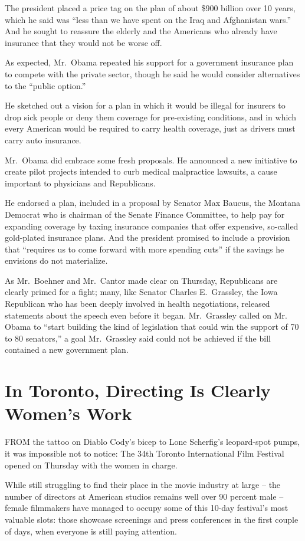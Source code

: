 ﻿\documentclass[12pt]{article}
\begin{document}
The president placed a price tag on the plan of about \$900 billion over 10 years, which he said was
``less than we have spent on the Iraq and Afghanistan wars.'' And he sought to reassure the elderly
and the Americans who already have insurance that they would not be worse off.

As expected, Mr.~Obama repeated his support for a government insurance plan to compete with the
private sector, though he said he would consider alternatives to the ``public option.''

He sketched out a vision for a plan in which it would be illegal for insurers to drop sick people or
deny them coverage for pre-existing conditions, and in which every American would be required to
carry health coverage, just as drivers must carry auto insurance.

Mr.~Obama did embrace some fresh proposals. He announced a new initiative to create pilot projects
intended to curb medical malpractice lawsuits, a cause important to physicians and Republicans.

He endorsed a plan, included in a proposal by Senator Max Baucus, the Montana Democrat who is
chairman of the Senate Finance Committee, to help pay for expanding coverage by taxing insurance
companies that offer expensive, so-called gold-plated insurance plans. And the president promised to
include a provision that ``requires us to come forward with more spending cuts'' if the savings he
envisions do not materialize.

As Mr.~Boehner and Mr.~Cantor made clear on Thursday, Republicans are clearly primed for a fight;
many, like Senator Charles E.~Grassley, the Iowa Republican who has been deeply involved in health
negotiations, released statements about the speech even before it began. Mr.~Grassley called on Mr.
Obama to ``start building the kind of legislation that could win the support of 70 to 80 senators,''
a goal Mr.~Grassley said could not be achieved if the bill contained a new government plan.

\section{In Toronto, Directing Is Clearly Women's Work}

\lettrine{F}{ROM} the tattoo on Diablo Cody's bicep to Lone Scherfig's leopard-spot pumps, it was
impossible not to notice: The 34th Toronto International Film Festival opened on Thursday with the
women in charge.

While still struggling to find their place in the movie industry at large -- the number of directors
at American studios remains well over 90 percent male -- female filmmakers have managed to occupy
some of this 10-day festival's most valuable slots: those showcase screenings and press conferences
in the first couple of days, when everyone is still paying attention.
\end{document}
